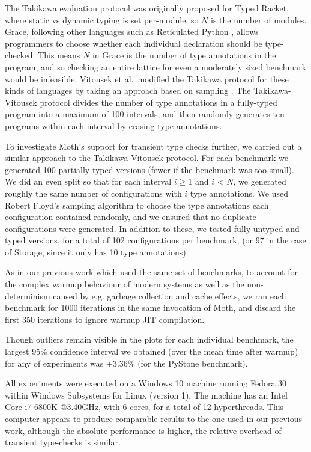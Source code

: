 \documentclass[sigplan,10pt,review,screen]{acmart}\settopmatter{printfolios=true}
\newcommand{\eg}{e.g.\xspace}
\begin{document}
The Takikawa evaluation protocol was originally proposed for Typed
Racket, where static vs dynamic typing is set per-module, so $N$ is
the number of modules. Grace, following other languages such as
Reticulated Python \cite{reticPython2014,monotonic2015,Vitousek2017},
allows programmers to choose whether each individual declaration should be type-checked. This means $N$ in Grace is the number of type annotations in the program, and so
checking an entire lattice for even a moderately sized benchmark would be infeasible.  Vitousek et al.\ modified the Takikawa protocol for
these kinds of languages by taking an approach based on sampling
\cite{vitousek-transient-arXive-2019}.  The Takikawa-Vitousek protocol
divides the number of type annotations in a fully-typed program into
a maximum of 100 intervals, and then randomly generates ten programs within
each interval by erasing type annotations.

To investigate Moth's support for transient type checks further, we carried out a similar approach to the Takikawa-Vitousek protocol. For each benchmark we generated 100 partially typed versions (fewer if the benchmark was too small). We did an even split so that for each interval $i \ge 1$ and $i$ < $N$, we generated roughly the same number of configurations with $i$ type annotations. We used Robert Floyd's sampling algorithm \cite{Bentley:1987:PPS:30401.315746} to choose the type annotations each configuration contained randomly, and we ensured that no duplicate configurations were generated. In addition to these, we tested fully untyped and typed versions, for a total of 102 configurations per benchmark, (or 97 in the case of Storage, since it only has 10 type annotations).

As in our previous work \cite{roberts-and-co-ecoop-2019} which used the same set of benchmarks, to account for the complex warmup behaviour of modern systems \citep{Barrett:2017:VMW} as well as
the non-determinism caused by \eg garbage collection and cache effects, we ran each benchmark for 1000 iterations in the same invocation of Moth, and discard the first 350 iterations to ignore warmup JIT compilation.

Though outliers remain visible in the plots for each individual benchmark, the largest 95\% confidence interval we obtained (over the mean time after warmup) for any of experiments was $\pm3.36\%$ (for the PyStone benchmark).

All experiments were executed on a Windows 10 machine
running Fedora 30 within Windows Subsystems for Linux (version 1). The machine has an Intel Core i7-6800K @3.40GHz, with 6 cores, for a total of 12 hyperthreads. This computer appears to produce comparable results to the one used in our previous work, although the absolute performance is higher, the relative overhead of transient type-checks is similar.
\end{document}
